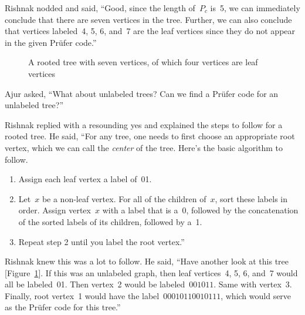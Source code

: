 Rishnak nodded and said, ``Good, since the length of~$P_c$ is~5, we can immediately conclude that there are seven vertices in the tree. Further, we can also conclude that vertices labeled~4, 5, 6, and~7 are the leaf vertices since they do not appear in the given Pr\"ufer code.''

\begin{figure}
\begin{center}


\caption{A rooted tree with seven vertices, of which four vertices are leaf vertices}\label{8g5}
\end{center}
\end{figure}

Ajur asked, ``What about unlabeled trees? Can we find a Pr\"ufer code for an unlabeled tree?''

Rishnak replied with a resounding yes and explained the steps to follow for a rooted tree. He said, ``For any tree, one needs to first choose an appropriate root vertex, which we can call the \textit{center} of the tree. Here's the basic algorithm to follow.
\begin{enumerate}
    \item Assign each leaf vertex a label of~01.
    \item Let~$x$ be a non-leaf vertex. For all of the children of~$x$, sort these labels in order. Assign vertex~$x$ with a label that is a~0, followed by the concatenation of the sorted labels of its children, followed by a~1.
    \item Repeat step 2 until you label the root vertex.''
\end{enumerate}

Rishnak knew this was a lot to follow. He said, ``Have another look at this tree [Figure~\ref{8g5}]. If this was an unlabeled graph, then leaf vertices~4, 5, 6, and~7 would all be labeled~01. Then vertex~2 would be labeled~$001011$. Same with vertex~3. Finally, root vertex~1 would have the label~$00010110010111$, which would serve as the Pr\"ufer code for this tree.''

